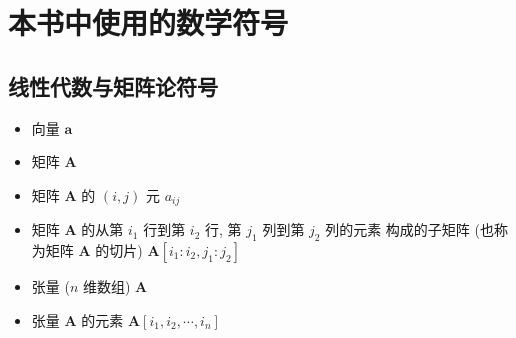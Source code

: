 \chapter*{本书中使用的数学符号}
\thispagestyle{empty}

\section*{线性代数与矩阵论符号}

\begin{itemize}[itemsep=0pt]
    \item 向量 $\boldsymbol{a}$
    \item 矩阵 $\boldsymbol{A}$
    \item 矩阵 $\boldsymbol{A}$ 的 $(i,j)$ 元 $a_{ij}$
    \item 矩阵 $\boldsymbol{A}$ 的从第 $i_1$ 行到第 $i_2$ 行, 第 $j_1$ 列到第 $j_2$ 列的元素
    构成的子矩阵 (也称为矩阵 $\boldsymbol{A}$ 的切片) $\boldsymbol{A}[i_1:i_2, j_1:j_2]$
    \item 张量 ($n$ 维数组) $\mathbf{A}$
    \item 张量 $\mathbf{A}$ 的元素 $\mathbf{A}[i_1,i_2,\cdots,i_n]$
\end{itemize}



